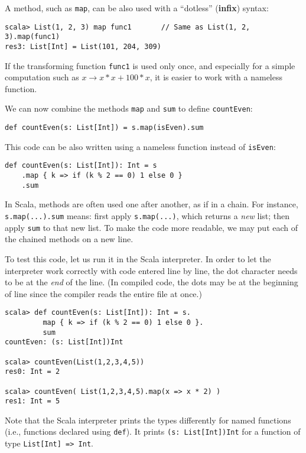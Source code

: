 A method, such as \lstinline!map!, can be also used with a \textsf{``}dotless\textsf{''}
(\textbf{infix}) syntax:
\begin{lstlisting}
scala> List(1, 2, 3) map func1       // Same as List(1, 2, 3).map(func1)
res3: List[Int] = List(101, 204, 309)
\end{lstlisting}

If the transforming function \lstinline!func1! is used only once,
and especially for a simple computation such as $x\rightarrow x*x+100*x$,
it is easier to work with a nameless function.

We can now combine the methods \texttt{}\lstinline!map! and \texttt{}\lstinline!sum!
to define \lstinline!countEven!:

\begin{lstlisting}
def countEven(s: List[Int]) = s.map(isEven).sum
\end{lstlisting}

This code can be also written using a nameless function instead of
\lstinline!isEven!:

\begin{lstlisting}
def countEven(s: List[Int]): Int = s
    .map { k => if (k % 2 == 0) 1 else 0 }
    .sum
\end{lstlisting}

In Scala, methods are often used one after another, as if in a chain.
For instance, \lstinline!s.map(...).sum! means: first apply \lstinline!s.map(...)!,
which returns a \emph{new} list; then apply \texttt{}\lstinline!sum!
to that new list. To make the code more readable, we may put each
of the chained methods on a new line. 

To test this code, let us run it in the Scala interpreter. In order
to let the interpreter work correctly with code entered line by line,
the dot character needs to be at the \emph{end} of the line. (In compiled
code, the dots may be at the beginning of line since the compiler
reads the entire file at once.)
\begin{lstlisting}
scala> def countEven(s: List[Int]): Int = s.
         map { k => if (k % 2 == 0) 1 else 0 }.
         sum
countEven: (s: List[Int])Int

scala> countEven(List(1,2,3,4,5))
res0: Int = 2

scala> countEven( List(1,2,3,4,5).map(x => x * 2) )
res1: Int = 5
\end{lstlisting}
Note that the Scala interpreter prints the types differently for named
functions (i.e., functions declared using \lstinline!def!). It prints
\lstinline!(s: List[Int])Int! for a function of type \lstinline!List[Int] => Int!.

